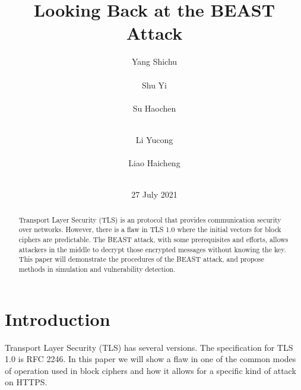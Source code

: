 \documentclass{acm_proc_article-sp}
\begin{document}
\title{
Looking Back at the BEAST Attack
}
\author{
\alignauthor
Yang Shichu\\
    \\
\alignauthor
Shu Yi\\
    \\
\alignauthor
Su Haochen\\
    \\
\and
\alignauthor
Li Yucong\\
    \\
\alignauthor
Liao Haicheng\\
    \\
}
\date{27 July 2021}
\maketitle
\begin{abstract}
Transport Layer Security (TLS) is an protocol that provides communication
security over networks. However, there is a flaw in TLS 1.0 where the initial
vectors for block ciphers are predictable. The BEAST attack, with some
prerequisites and efforts, allows attackers in the middle to decrypt those
encrypted messages without knowing the key.
This paper will demonstrate the procedures of the BEAST attack, and propose
methods in simulation and vulnerability detection.
\end{abstract}




\section{Introduction}
Transport Layer Security (TLS) has several versions. The specification for TLS
1.0 is RFC 2246\cite{rfc2246}.
In this paper we will show a flaw in one of the common modes of operation used in block ciphers
and how it allows for a specific kind of attack\cite{beast} on HTTPS.
\end{document}

